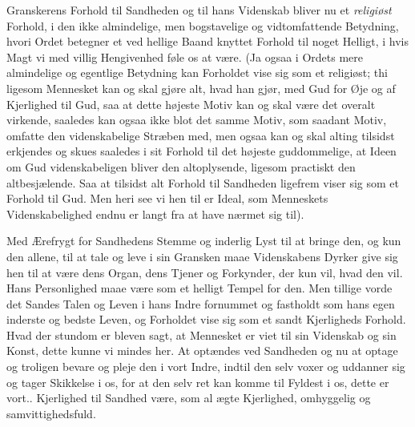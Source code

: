 \documentclass[12pt,a4paper]{book}
\newcommand{\apage}[1]{\marginnote{\footnotesize\textit{[#1]}}}
\begin{document}
Granskerens Forhold
til Sandheden og til hans Videnskab bliver nu et \emph{religiøst} Forhold, i den
ikke almindelige, men bogstavelige og vidtomfattende Betydning, hvori Ordet
betegner et ved hellige Baand knyttet Forhold til noget Helligt, i hvis Magt vi
med villig Hengivenhed føle os at være. (Ja ogsaa i Ordets mere almindelige og
egentlige Betydning kan Forholdet vise sig som et religiøst; thi ligesom
Mennesket kan og skal gjøre alt, hvad han gjør, med Gud for Øje og af Kjerlighed
til Gud, saa at dette højeste Motiv kan og skal være det overalt virkende,
saaledes kan ogsaa ikke blot det samme Motiv, som saadant Motiv, omfatte den
videnskabelige Stræben med, men ogsaa kan og skal alting tilsidst erkjendes og
skues saaledes i sit Forhold til det højeste guddommelige, at Ideen om Gud
videnskabeligen bliver den altoplysende, ligesom practiskt den altbesjælende.
Saa at tilsidst alt Forhold til Sandheden ligefrem viser sig som et Forhold til
Gud. Men heri see vi hen til er Ideal, som Menneskets Videnskabelighed endnu er
langt fra at have nærmet sig til).

Med Ærefrygt for Sandhedens Stemme og inderlig
Lyst til at bringe den, og kun den allene, til at tale og leve i sin Gransken
maae Videnskabens Dyrker give sig hen til at være dens  \apage{12} Organ, dens Tjener og
Forkynder, der kun vil, hvad den vil. Hans Personlighed maae være som et helligt
Tempel for den. Men tillige vorde det Sandes Talen og Leven i hans Indre
fornummet og fastholdt som hans egen inderste og bedste Leven, og Forholdet vise
sig som et sandt Kjerligheds Forhold. Hvad der stundom er bleven sagt, at
Mennesket er viet til sin Videnskab og sin Konst, dette kunne vi mindes her. At
optændes ved Sandheden og nu at optage og troligen bevare og pleje den i vort
Indre, indtil den selv voxer og uddanner sig og tager Skikkelse i os, for at den
selv ret kan komme til Fyldest i os, dette er vort.. Kjerlighed til Sandhed være,
som al ægte Kjerlighed, omhyggelig og samvittighedsfuld.
\end{document}
